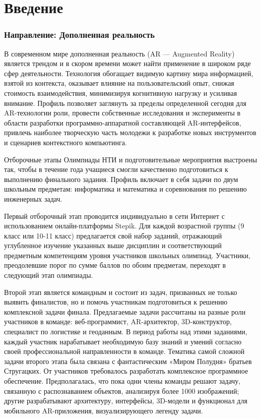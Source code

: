 \begingroup
\pagestyle{empty}

\section*{Введение}

\subsubsection*{Направление: Дополненная реальность}

В современном мире дополненная реальность (AR — Augmented Reality) является трендом и в скором времени может найти применение в широком ряде сфер деятельности. Технология обогащает видимую картину мира информацией, взятой из контекста, оказывает влияние на пользовательский опыт, снижая стоимость взаимодействия, минимизируя когнитивную нагрузку и усиливая внимание. Профиль позволяет заглянуть за пределы определенной сегодня для AR-технологии роли, провести собственные исследования и эксперименты в области разработки программно-аппаратной составляющей AR-интерфейсов, привлечь наиболее творческую часть молодежи к разработке новых инструментов и сценариев контекстного компьютинга.

Отборочные этапы Олимпиады НТИ и подготовительные мероприятия выстроены так, чтобы в течение года учащиеся смогли качественно подготовиться к выполнению финального задания. Профиль включает в себя задачи по двум школьным предметам: информатика и математика и соревнования по решению инженерных задач. 

Первый отборочный этап проводится индивидуально в сети Интернет с использованием онлайн-платформы Stepik. Для каждой возрастной группы (9 класс или 10-11 класс) предлагается свой набор заданий, отражающий углубленное изучение указанных выше дисциплин и соответствующий предметным компетенциям уровня участников школьных олимпиад. Участники, преодолевшие порог по сумме баллов по обоим предметам, переходят в следующий этап олимпиады.

Второй этап является командным и состоит из задач, призванных не только выявить финалистов, но и помочь участникам подготовиться к решению комплексной задачи финала. Предлагаемые задачи рассчитаны на разные роли участников в команде: веб-программист, AR-архитектор, 3D-конструктор, специалист по логистике и геоданным. В период работы над этими заданиями, каждый участник нарабатывает необходимую базу знаний и умений согласно своей профессиональной направленности в команде. Тематика самой сложной задачи второго этапа была связана с фантастическим «Миром Полудня» братьев Стругацких. От участников требовалось разработать комплексное программное обеспечение. Предполагалась, что пока одни члены команды решают задачу, связанную с распознаванием объектов, анализируя более 1000 изображений; другие разрабатывают архитектуру, интерфейсы, 3D-модели и функционал для мобильного AR-приложения, визуализирующего легенду задачи.

